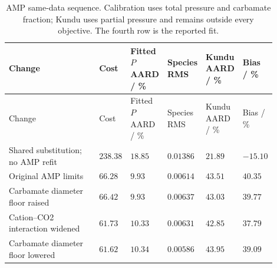 \begingroup\small\setlength{\tabcolsep}{3pt}
\begin{longtable}{@{}>{\raggedright\arraybackslash}p{0.35\linewidth}>{\raggedright\arraybackslash}p{0.09\linewidth}>{\raggedright\arraybackslash}p{0.13\linewidth}>{\raggedright\arraybackslash}p{0.11\linewidth}>{\raggedright\arraybackslash}p{0.13\linewidth}>{\raggedright\arraybackslash}p{0.09\linewidth}@{}}
\caption{AMP same-data sequence. Calibration uses total pressure and carbamate fraction; Kundu uses partial pressure and remains outside every objective. The fourth row is the reported fit.}\label{tab:p2-amp-chain}\\
\toprule Change & Cost & Fitted $P$ AARD / \% & Species RMS & Kundu AARD / \% & Bias / \% \\ \midrule\endfirsthead
\toprule Change & Cost & Fitted $P$ AARD / \% & Species RMS & Kundu AARD / \% & Bias / \% \\ \midrule\endhead
\bottomrule\endfoot
Shared substitution; no AMP refit & $238.38$ & $18.85$ & $0.01386$ & $21.89$ & $-15.10$ \\
Original AMP limits & $66.28$ & $9.93$ & $0.00614$ & $43.51$ & $40.35$ \\
Carbamate diameter floor raised & $66.42$ & $9.93$ & $0.00637$ & $43.03$ & $39.77$ \\
Cation--CO2 interaction widened & $61.73$ & $10.33$ & $0.00631$ & $42.85$ & $37.79$ \\
Carbamate diameter floor lowered & $61.62$ & $10.34$ & $0.00586$ & $43.95$ & $39.09$ \\
\end{longtable}\endgroup
